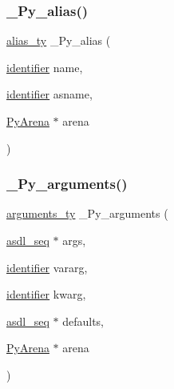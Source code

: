 \subsubsection{\texorpdfstring{\_Py\_alias()}{\_Py\_alias()}}
{\footnotesize\ttfamily \mbox{\hyperlink{_python-ast_8h_a01f738700190ffcf2da799b99e05cbd1}{alias\+\_\+ty}} \+\_\+\+Py\+\_\+alias (\begin{DoxyParamCaption}\item[{\mbox{\hyperlink{asdl_8h_a78ca2081e230a95abc88c411c9816775}{identifier}}}]{name,  }\item[{\mbox{\hyperlink{asdl_8h_a78ca2081e230a95abc88c411c9816775}{identifier}}}]{asname,  }\item[{\mbox{\hyperlink{pyarena_8h_a9edeb357fbb27333471022a0975adb7a}{Py\+Arena}} $\ast$}]{arena }\end{DoxyParamCaption})}

\mbox{\label{_python-ast_8h_a6c593ed47b25ab1663958b1370d24afc}} 
\subsubsection{\texorpdfstring{\_Py\_arguments()}{\_Py\_arguments()}}
{\footnotesize\ttfamily \mbox{\hyperlink{_python-ast_8h_a45cc6e94d598fdc335d8c85739108a3e}{arguments\+\_\+ty}} \+\_\+\+Py\+\_\+arguments (\begin{DoxyParamCaption}\item[{\mbox{\hyperlink{structasdl__seq}{asdl\+\_\+seq}} $\ast$}]{args,  }\item[{\mbox{\hyperlink{asdl_8h_a78ca2081e230a95abc88c411c9816775}{identifier}}}]{vararg,  }\item[{\mbox{\hyperlink{asdl_8h_a78ca2081e230a95abc88c411c9816775}{identifier}}}]{kwarg,  }\item[{\mbox{\hyperlink{structasdl__seq}{asdl\+\_\+seq}} $\ast$}]{defaults,  }\item[{\mbox{\hyperlink{pyarena_8h_a9edeb357fbb27333471022a0975adb7a}{Py\+Arena}} $\ast$}]{arena }\end{DoxyParamCaption})}

\mbox{\label{_python-ast_8h_a49ca293b711e4c7548184670d3e4e17f}} 
